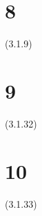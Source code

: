 \documentclass{article}
\begin{document}
\section*{8}
(3.1.9)\\

\section*{9}
(3.1.32)
\section*{10}
(3.1.33)
\end{document}
